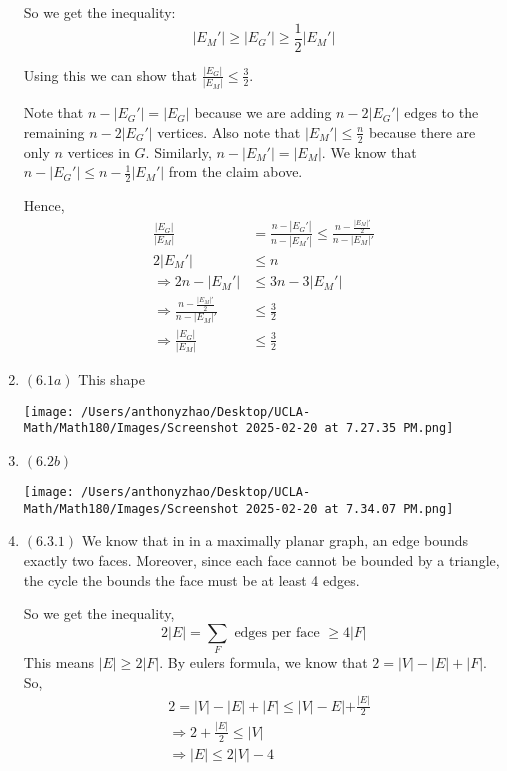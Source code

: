 \documentclass[12pt]{article}
\begin{document}
\begin{enumerate}[start=1,label={\bfseries Problem \arabic*:},leftmargin=1in]
    So we get the inequality:
    \[ 
       |E_{M}'| \geq |E_{G}'| \geq \frac{1}{2} |E_{M}'| 
    \]

    Using this we can show that $\frac{|E_{G}|}{|E_{M}|} \leq \frac{3}{2}$. 

    Note that $n - |E_{G}'| = |E_{G}|$ because we are adding $n - 2|E_{G}'|$ edges to the remaining $n - 2|E_{G}'|$ vertices. 
    Also note that $|E_{M}'| \leq \frac{n}{2}$ because there are only $n$ vertices in $G$. 
    Similarly, $n - |E_{M}'| = |E_{M}|$. 
    We know that $n - |E_{G}'| \leq n - \frac{1}{2}|E_{M}'|$ from the claim above. 
    
    Hence, 
    \begin{align*}
        \frac{|E_{G}|}{|E_{M}|} &= \frac{n-|E_{G}'|}{n - |E_{M}'|} \leq \frac{n - \frac{|E_{M}|'}{2}}{n-|E_{M}|'}\\
        2|E_{M}'|&\leq n\\ 
        \Rightarrow 2n - |E_{M}'| &\leq 3n - 3|E_{M}'|\\
        \Rightarrow \frac{n - \frac{|E_{M}|'}{2}}{n-|E_{M}|'} &\leq \frac{3}{2}\\
        \Rightarrow \frac{|E_{G}|}{|E_{M}|} &\leq \frac{3}{2}
    \end{align*}


    \item $(6.1a)$ This shape 

    \texttt{[image: /Users/anthonyzhao/Desktop/UCLA-Math/Math180/Images/Screenshot 2025-02-20 at 7.27.35 PM.png]}
    \item $(6.2b)$

    \texttt{[image: /Users/anthonyzhao/Desktop/UCLA-Math/Math180/Images/Screenshot 2025-02-20 at 7.34.07 PM.png]}
    \item $(6.3.1)$ We know that in in a maximally planar graph, an edge bounds exactly two faces. 
    Moreover, since each face cannot be bounded by a triangle, the cycle the bounds the face must be at least 4 edges. 
    
    So we get the inequality, 
    \[
        2|E| = \sum_{F} \text{ edges per face } \geq 4\left| F \right| 
    \]
    This means $|E| \geq 2|F|$. By eulers formula, we know that $2 = |V| - |E| + |F|$. So, 
    \begin{align*}
        &2 = |V| - |E| + |F| \leq |V| - E| + \frac{|E|}{2} \\ 
        &\Rightarrow 2 + \frac{|E|}{2} \leq |V| \\
        &\Rightarrow |E| \leq 2|V| - 4
    \end{align*}
    

\end{enumerate}
\end{document}
